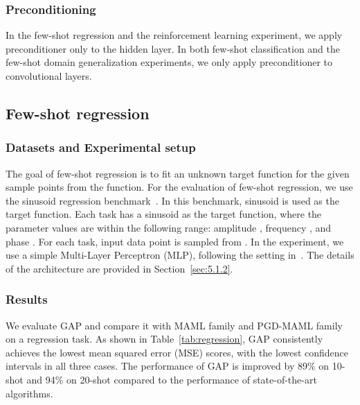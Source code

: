 \subsubsection{Preconditioning}
In the few-shot regression and the reinforcement learning experiment, we apply preconditioner only to the hidden layer. In both few-shot classification and the few-shot domain generalization experiments, we only apply preconditioner to convolutional layers.

\subsection{Few-shot regression}
\subsubsection{Datasets and Experimental setup}
The goal of few-shot regression is to fit an unknown target function for the given  sample points from the function.
For the evaluation of few-shot regression, we use the sinusoid regression benchmark~\cite{finn2017model}.
In this benchmark, sinusoid is used as the target function. Each task has a sinusoid  as the target function, where the parameter values are within the following range: amplitude , frequency , and phase . For each task, input data point  is sampled from . 
In the experiment, we use a simple Multi-Layer Perceptron (MLP), following the setting in~\cite{finn2017model}. 
The details of the architecture are provided in Section~\ref{sec:5.1.2}.

\subsubsection{Results}
We evaluate GAP and compare it with MAML family and PGD-MAML family on a regression task. As shown in Table~\ref{tab:regression}, GAP consistently achieves the lowest mean squared error (MSE) scores, with the lowest confidence intervals in all three cases. The performance of GAP is improved by 89\% on 10-shot and 94\% on 20-shot compared to the performance of state-of-the-art algorithms.

